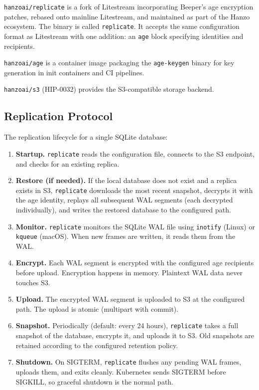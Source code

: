 \documentclass[11pt]{article}
\begin{document}
\texttt{hanzoai/replicate} is a fork of Litestream incorporating Beeper's
age encryption patches, rebased onto mainline Litestream, and maintained as
part of the Hanzo ecosystem. The binary is called \texttt{replicate}. It
accepts the same configuration format as Litestream with one addition: an
\texttt{age} block specifying identities and recipients.

\texttt{hanzoai/age} is a container image packaging the \texttt{age-keygen}
binary for key generation in init containers and CI pipelines.

\texttt{hanzoai/s3} (HIP-0032) provides the S3-compatible storage backend.

\subsection{Replication Protocol}

The replication lifecycle for a single SQLite database:

\begin{enumerate}[nosep]
    \item \textbf{Startup.} \texttt{replicate} reads the configuration file,
    connects to the S3 endpoint, and checks for an existing replica.

    \item \textbf{Restore (if needed).} If the local database does not exist
    and a replica exists in S3, \texttt{replicate} downloads the most recent
    snapshot, decrypts it with the age identity, replays all subsequent WAL
    segments (each decrypted individually), and writes the restored database
    to the configured path.

    \item \textbf{Monitor.} \texttt{replicate} monitors the SQLite WAL file
    using \texttt{inotify} (Linux) or \texttt{kqueue} (macOS). When new
    frames are written, it reads them from the WAL.

    \item \textbf{Encrypt.} Each WAL segment is encrypted with the
    configured age recipients before upload. Encryption happens in memory.
    Plaintext WAL data never touches S3.

    \item \textbf{Upload.} The encrypted WAL segment is uploaded to S3 at the
    configured path. The upload is atomic (multipart with commit).

    \item \textbf{Snapshot.} Periodically (default: every 24 hours),
    \texttt{replicate} takes a full snapshot of the database, encrypts it,
    and uploads it to S3. Old snapshots are retained according to the
    configured retention policy.

    \item \textbf{Shutdown.} On SIGTERM, \texttt{replicate} flushes any
    pending WAL frames, uploads them, and exits cleanly. Kubernetes sends
    SIGTERM before SIGKILL, so graceful shutdown is the normal path.
\end{enumerate}
\end{document}

